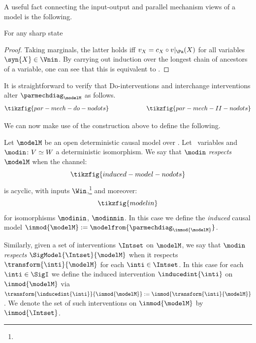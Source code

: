 \documentclass{article}
\begin{document}
A useful fact connecting the input-output and parallel mechanism views of a model is the following.
\begin{lemma} \label{lem:fixpoints}
For any sharp state 
\end{lemma}
\begin{proof} 
Taking marginals, the latter holds iff $v_X = c_X \circ v|_\Pa(X)$ for all variables $\syn{X} \in \Vnin$. By carrying out induction over the longest chain of ancestors of a variable, one can see that this is equivalent to .  
\end{proof}


\begin{example} \label{ex:II-PMs} 
It is straightforward to verify that Do-interventions and interchange interventions alter $\parmechdiag_\modelM$ as follows.
\begin{equation} \label{eq:II-diag}
\tikzfig{par-mech-do-nodots}
\qquad \qquad \qquad 
\tikzfig{par-mech-II-nodots}
\end{equation}
\end{example}

We can now make use of the construction above to define the following. 


\begin{definition} \label{def:model-induction}
Let $\modelM$ be an open deterministic causal model over . 
Let \ variables and $\modin \colon V \simeq W$ a deterministic isomorphism. We say that $\modin$ \emph{respects} $\modelM$ when the channel: 
\begin{equation} \label{eq:induced-model}
\tikzfig{induced-model-nodots}
\end{equation}
is acyclic, with inputs $\Win$,\footnote{} and moreover: 
\begin{equation} \label{eq:respects-inputs}
\tikzfig{modelin}
\end{equation}
for isomorphisms $\modinin$, $\modinnin$. In this case we define the \emph{induced} causal model $\inmod{\modelM} := \modelfrom{\parmechdiag_{\inmod{\modelM}}}$. 

Similarly, given a set of interventions $\Intset$ on $\modelM$, we say that $\modin$ \emph{respects} $\SigModel{\Intset}{\modelM}$ when it respects $\transform{\inti}{\modelM}$ for each $\inti \in \Intset$. In this case for each $\inti \in \SigI$ we define the induced intervention $\inducedint{\inti}$ on $\inmod{
\modelM}$ via $\transform{\inducedint{\inti}}{\inmod{\modelM}} := \inmod{\transform{\inti}{\modelM}}$. 
 We denote the set of such interventions on $\inmod{\modelM}$ by $\inmod{\Intset}$. 
\end{definition} 
\end{document}
